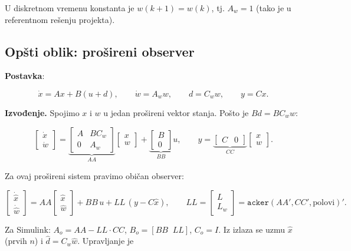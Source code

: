 \documentclass[11pt,a4paper,parskip=half,headsepline,numbers=noenddot]{scrartcl}
\begin{document}
U diskretnom vremenu konstanta je \(w(k+1) = w(k)\), tj. \(A_w = 1\) (tako je u referentnom rešenju projekta).

\subsection{Opšti oblik: prošireni observer}

\textbf{Postavka}:

\[\dot x = Ax + B(u + d),\qquad \dot w = A_ww,\qquad d = C_ww,\qquad y = Cx .\]

\textbf{Izvođenje.} Spojimo \(x\) i \(w\) u jedan prošireni vektor stanja. Pošto je \(Bd = BC_ww\):

\[\begin{bmatrix}\dot x\\ \dot w\end{bmatrix} = \underbrace{\begin{bmatrix}A & BC_w\\ 0 & A_w\end{bmatrix}}_{AA}\begin{bmatrix}x\\ w\end{bmatrix} + \underbrace{\begin{bmatrix}B\\ 0\end{bmatrix}}_{BB}u,\qquad y = \underbrace{\begin{bmatrix}C & 0\end{bmatrix}}_{CC}\begin{bmatrix}x\\ w\end{bmatrix}.\]

Za ovaj prošireni sistem pravimo običan observer:

\[\begin{bmatrix}\dot{\hat x}\\ \dot{\hat w}\end{bmatrix} = AA\begin{bmatrix}\hat x\\ \hat w\end{bmatrix} + BB\,u + LL\,(y - C\hat x),\qquad LL = \begin{bmatrix}L\\ L_w\end{bmatrix} = \texttt{acker}(AA', CC', \text{polovi})' .\]

Za Simulink: \(A_o = AA - LL\cdot CC\), \(B_o = [BB\;\; LL]\), \(C_o = I\). Iz izlaza se uzmu \(\hat x\) (prvih \(n\)) i \(\hat d = C_w\hat w\). Upravljanje je
\end{document}
